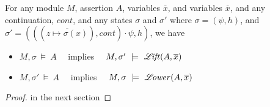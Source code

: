  
\begin{lemma}
For any module $M$, assertion $A$, variables $\overline x$, and variables $\overline x$,  %
and any continuation, $cont$, and any states $\sigma$ and $\sigma'$ where 
$\sigma=(\psi,h)$, and $\sigma'=(((\overline {z \mapsto \sigma(x)}), cont)\cdot \psi, h)$,  
we have

\begin{itemize}
\item
$M,\sigma\ \models\  A$  \ \ implies \ \  $M,\sigma' \ \models\  {\mathcal{L}\!\mathit{ift}(A,\overline x)}   $
\item
$M,\sigma'\ \models\  A$  \ \ implies \ \  $M,\sigma  \ \models\  \llower  {A}  {\overline   x} $ 
\end{itemize}
\end{lemma}
\begin{proof}
in the next section
\end{proof}


 